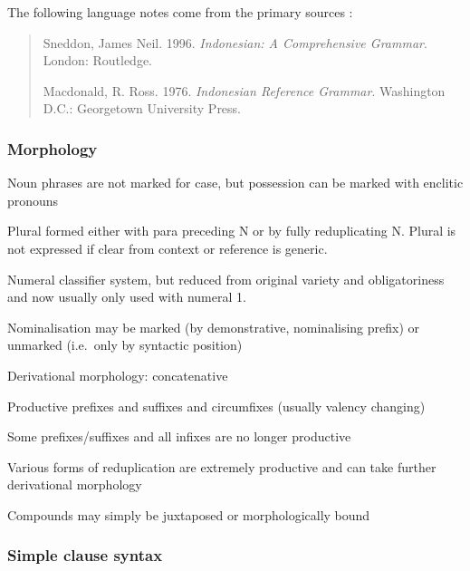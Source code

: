 \documentclass[a4paper, 11pt]{book}
\begin{document}
The following language notes come from the primary sources \citep{sneddon2012indonesian, macdonald1976indonesian}:

\begin{quote}
 Sneddon, James Neil. 1996. \textit{Indonesian: A Comprehensive Grammar}. London: Routledge.


 Macdonald, R. Ross. 1976. \textit{Indonesian Reference Grammar}. Washington D.C.: Georgetown University Press.
\end{quote}

\subsubsection*{Morphology}

\begin{itemize*}
\item  Noun phrases are not marked for case, but possession can be marked with enclitic pronouns
\item  Plural formed either with para preceding N or by fully reduplicating N. Plural is not expressed if clear from context or reference is generic.
\item  Numeral classifier system, but reduced from original variety and obligatoriness and now usually only used with numeral 1.
\item  Nominalisation may be marked (by demonstrative, nominalising prefix) or unmarked (i.e.\ only by syntactic position)
\item  Derivational morphology: concatenative
        \begin{itemize*}
	\item  Productive prefixes and suffixes and circumfixes (usually valency changing)
	\item  Some prefixes/suffixes and all infixes are no longer productive
	\item  Various forms of reduplication are extremely productive and can take further derivational 	morphology
	\item  Compounds may simply be juxtaposed or morphologically bound
        \end{itemize*}
\end{itemize*}

\subsubsection*{Simple clause syntax}
\end{document}

